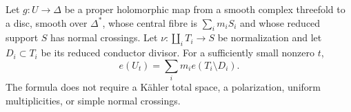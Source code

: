
\begin{proposition}\label{cdp:st:C.2.NC.1}
Let $g:U\to\Delta$ be a proper holomorphic map from a smooth complex threefold to a disc, smooth over $\Delta^*$, whose central fibre is $\sum_i m_iS_i$ and whose reduced support $S$ has normal crossings. Let $\nu:\coprod_i T_i\to S$ be normalization and let $D_i\subset T_i$ be its reduced conductor divisor. For a sufficiently small nonzero $t$,
\[
 e(U_t)=\sum_i m_i e(T_i\setminus D_i).
 \tag{C.NC.1}\label{cdp:eq:C.NC.1}
\]
The formula does not require a Kähler total space, a polarization, uniform multiplicities, or simple normal crossings.
\end{proposition}

